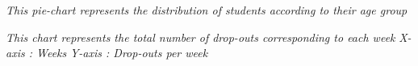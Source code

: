 \documentclass[a4paper,12pt,oneside]{sphinxmanual}
\begin{document}
\emph{This pie-chart represents the distribution of students according to their age group}
\begin{figure}[htbp]
\centering

\end{figure}

\emph{This chart represents the total number of drop-outs corresponding to each week}
\emph{X-axis : Weeks}
\emph{Y-axis : Drop-outs per week}
\begin{figure}[htbp]
\centering

\end{figure}
\end{document}
